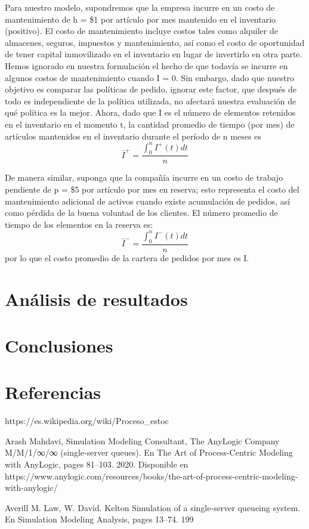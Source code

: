 Para nuestro modelo, supondremos que la empresa incurre en un costo de mantenimiento de
h = \$1 por artículo por mes mantenido en el inventario (positivo).
El costo de mantenimiento incluye costos tales como alquiler de almacenes, seguros, impuestos
y mantenimiento, así como el costo de oportunidad de tener capital inmovilizado en el inventario
en lugar de invertirlo en otra parte.
Hemos ignorado en nuestra formulación el hecho de que todavía se incurre en algunos costos de
mantenimiento cuando I = 0.
Sin embargo, dado que nuestro objetivo es comparar las políticas de pedido, ignorar este factor,
que después de todo es independiente de la política utilizada, no afectará nuestra evaluación
de qué política es la mejor.
Ahora, dado que I es el número de elementos retenidos en el inventario en el momento t,
la cantidad promedio de tiempo (por mes) de artículos mantenidos en el inventario durante el
período de n meses es
\begin{equation}
  \label{eq:equation11}
  \bar{I}^{+}=\frac{\int_{0}^{n}I^{+}(t)dt}{n}
\end{equation}

De manera similar, suponga que la compañía incurre en un costo de trabajo pendiente de p = \$5 por
artículo por mes en reserva;
esto representa el costo del mantenimiento adicional de activos cuando existe acumulación de pedidos,
así como pérdida de la buena voluntad de los clientes.
El número promedio de tiempo de los elementos en la reserva es:
\begin{equation}
    \label{eq:equation12}
    \bar{I}^{-}=\frac{\int_{0}^{n}I^{-}(t)dt}{n}
\end{equation}
por lo que el costo promedio de la cartera de pedidos por mes es \pi I.

\section{Análisis de resultados}

    
    


\section{Conclusiones}
\section{Referencias}
  \label{sec:references}
    https://es.wikipedia.org/wiki/Proceso\_estoc%

    Arash Mahdavi, Simulation Modeling Consultant, The AnyLogic Company M/M/1/∞/∞ (single-server
    queues). En The Art of Process-Centric Modeling with AnyLogic, pages 81–103. 2020. Disponible en https://www.anylogic.com/resources/books/the-art-of-process-centric-modeling-with-anylogic/

    Averill M. Law, W. David. Kelton Simulation of a single-server queueing system. En Simulation Modeling Analysis,
    pages 13–74. 199
